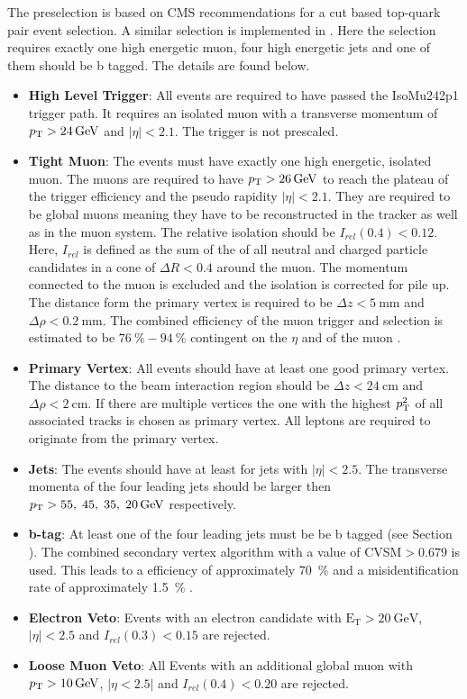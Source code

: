 The preselection is based on CMS recommendations for a cut based top-quark pair event selection. A similar selection is implemented in \cite{CMS-PAS-TOP-12-027}. Here the selection requires exactly one high energetic muon, four high energetic jets and one of them should be b tagged. The details are found below.

\begin{itemize}
\item \textbf{High Level Trigger}: All events are required to have passed the IsoMu242p1 trigger path. It requires an isolated muon with a transverse momentum of $p_{\mathrm{T}} > \SI{24}{\giga \electronvolt}$ and $| \eta | < 2.1$. The trigger is not prescaled.
\item \textbf{Tight Muon}: The events must have exactly one high energetic, isolated muon. The muons are required to have  $p_{\mathrm{T}} > \SI{26}{\giga \electronvolt}$ to reach the plateau of the trigger efficiency and the pseudo rapidity $| \eta | <2.1 $. They are required to be global muons meaning they have to be reconstructed in the tracker as well as in the muon system. The relative isolation should be $I_{rel}(0.4) < 0.12$. Here, $I_{rel}$ is defined as the sum of the \pt of all neutral and charged particle candidates in a cone of $\Delta R < 0.4$ around the muon. The momentum connected to the muon is excluded and the isolation is corrected for pile up. The distance form the primary vertex is required to be $\Delta z < \SI{5}{\milli \meter}$ and $\Delta \rho < \SI{0.2}{\milli \meter}$. The combined efficiency of the muon trigger and selection is estimated to be $\SI{76}{\percent}-\SI{94}{\percent}$ contingent on the $\eta$ and \pt of the muon \cite{CMS-DP-2013-009} \cite{Chatrchyan:2012xi}.
\item \textbf{Primary Vertex}: All events should have at least one good primary vertex. The distance to the beam interaction region should be $\Delta z < \SI{24}{\centi \meter}$ and $\Delta \rho < \SI{2}{\centi \meter}$. If there are multiple vertices the one with the highest $p_{\mathrm{T}}^2$ of all associated tracks is chosen as primary vertex. All leptons are required to originate from the primary vertex.
\item \textbf{Jets}: The events should have at least for jets with $| \eta | < 2.5$. The transverse momenta of the four leading jets should be larger then $p_{\mathrm{T}} > 55,\; 45,\; 35, \; \SI{20}{\giga \electronvolt}$ respectively. 
\item \textbf{b-tag}: At least one of the four leading jets must be be b tagged (see Section ). The combined secondary vertex algorithm with a value of CVSM$> 0.679$ is used. This leads to a efficiency of approximately \SI{70}{\percent} and a misidentification rate of approximately \SI{1.5}{\percent} \cite{CMS-PAS-TOP-12-027} \cite{Chatrchyan:2012jua}.
\item \textbf{Electron Veto}: Events with an electron candidate with $\mathrm{E}_{\mathrm{T}} > \SI{20}{\giga \electronvolt}$, $| \eta |< 2.5$ and $I_{rel}(0.3)< 0.15$ are rejected.
\item \textbf{Loose Muon Veto}: All Events with an additional global muon with $p_{\mathrm{T}} > \SI{10}{\giga \electronvolt}$, $|\eta < 2.5|$ and $I_{rel}(0.4)<0.20$ are rejected. 
\end{itemize}

